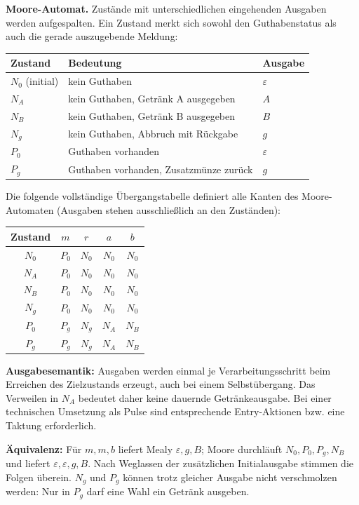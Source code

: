 \textbf{Moore-Automat.} Zustände mit unterschiedlichen eingehenden Ausgaben werden aufgespalten. Ein Zustand merkt sich sowohl den Guthabenstatus als auch die gerade auszugebende Meldung:
\begin{center}
\renewcommand{\arraystretch}{1.3}
\begin{tabular}{lll}
Zustand & Bedeutung & Ausgabe \\\hline
$N_0$ (initial) & kein Guthaben & $\varepsilon$ \\
$N_A$ & kein Guthaben, Getränk A ausgegeben & $A$ \\
$N_B$ & kein Guthaben, Getränk B ausgegeben & $B$ \\
$N_g$ & kein Guthaben, Abbruch mit Rückgabe & $g$ \\
$P_0$ & Guthaben vorhanden & $\varepsilon$ \\
$P_g$ & Guthaben vorhanden, Zusatzmünze zurück & $g$
\end{tabular}
\end{center}
Die folgende vollständige Übergangstabelle definiert alle Kanten des Moore-Automaten (Ausgaben stehen ausschließlich an den Zuständen):
\begin{center}
\renewcommand{\arraystretch}{1.35}
\begin{tabular}{c|cccc}
Zustand & $m$ & $r$ & $a$ & $b$ \\\hline
$N_0$ & $P_0$ & $N_0$ & $N_0$ & $N_0$ \\
$N_A$ & $P_0$ & $N_0$ & $N_0$ & $N_0$ \\
$N_B$ & $P_0$ & $N_0$ & $N_0$ & $N_0$ \\
$N_g$ & $P_0$ & $N_0$ & $N_0$ & $N_0$ \\
$P_0$ & $P_g$ & $N_g$ & $N_A$ & $N_B$ \\
$P_g$ & $P_g$ & $N_g$ & $N_A$ & $N_B$
\end{tabular}
\end{center}
\textbf{Ausgabesemantik:} Ausgaben werden einmal je Verarbeitungsschritt beim Erreichen des Zielzustands erzeugt, auch bei einem Selbstübergang. Das Verweilen in $N_A$ bedeutet daher keine dauernde Getränkeausgabe. Bei einer technischen Umsetzung als Pulse sind entsprechende Entry-Aktionen bzw. eine Taktung erforderlich.

\textbf{Äquivalenz:} Für $m,m,b$ liefert Mealy $\varepsilon,g,B$; Moore durchläuft $N_0,P_0,P_g,N_B$ und liefert $\varepsilon,\varepsilon,g,B$. Nach Weglassen der zusätzlichen Initialausgabe stimmen die Folgen überein. $N_g$ und $P_g$ können trotz gleicher Ausgabe nicht verschmolzen werden: Nur in $P_g$ darf eine Wahl ein Getränk ausgeben.
\newpage
